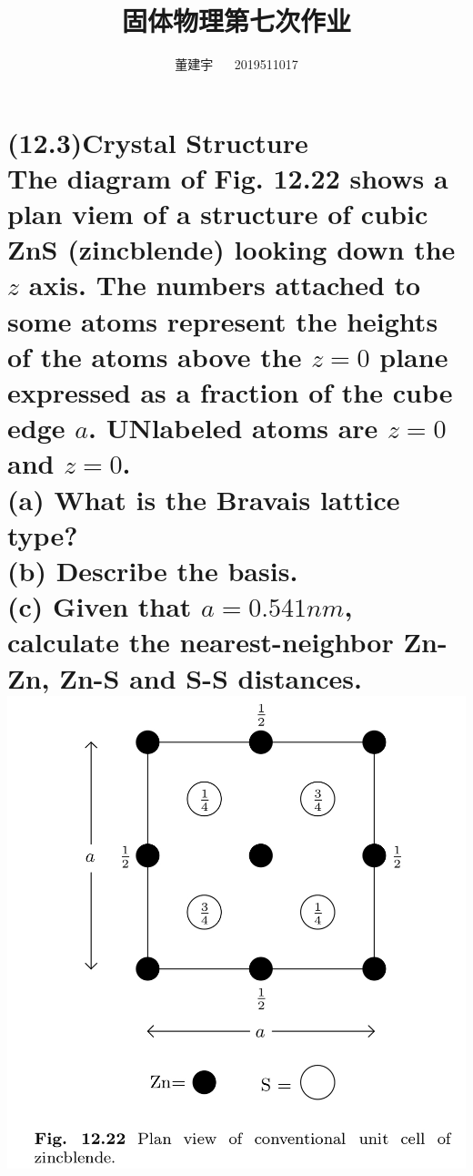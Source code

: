 \documentclass[reqno,a4paper,12pt]{amsart}
\title{固体物理第七次作业}
\author{董建宇 ~~ 2019511017}
\begin{document}
\maketitle
\titleformat{\section}[hang]{\small}{\thesection}{0.8em}{}{}
\titleformat{\subsection}[hang]{\small}{\thesubsection}{0.8em}{}{}

\section{(12.3)\textbf{Crystal Structure} \\
The diagram of Fig. 12.22 shows a plan viem of a structure of cubic ZnS (zincblende) looking down the $z$ axis. The numbers attached to some atoms represent the heights of the atoms above the $z = 0$ plane expressed as a fraction of the cube edge $a$. UNlabeled atoms are $z = 0$ and $z = 0$. \\
(a) What is the Bravais lattice type? \\
(b) Describe the basis. \\
(c) Given that $a = 0.541nm$, calculate the nearest-neighbor Zn-Zn, Zn-S and S-S distances. \\
\includegraphics[scale = 0.19]{12.3.jpeg}}
\end{document}
